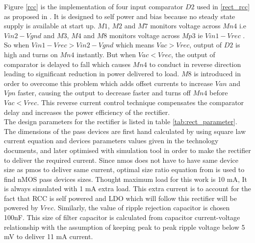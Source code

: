 \documentclass[12pt,a4paper,UKenglish]{report}
\begin{document}
Figure \ref{rcc}  is the implementation of four input comparator $D2$ used in \ref{rect_rcc} as proposed in \cite{rectrcc}. It is designed to self power and bias because no steady state supply is available at start up. $M1$, $M2$ and $M7$ monitors voltage across $Mn4$ i.e $Vin2 - Vgnd$ and $M3$, $M4$ and $M8$ monitors voltage across $Mp3$ ie $Vin1 - Vrec$ . So when $Vin1 - Vrec > Vin2 - Vgnd$ which means $Vac > Vrec$, output of $D2$ is high and turns on $Mn4$ instantly. But when $Vac < Vrec$, the output of comparator is delayed to fall which causes $Mn4$ to conduct in reverse direction leading to significant reduction in power delivered to load. $M8$ is introduced in order to overcome this problem which adds offset currents to increase $Van$ and $Vpn$ faster, causing the output to decrease faster and turns off $Mn4$ before $Vac < Vrec$. This reverse current control technique compensates the comparator delay and increases the power efficiency of the rectifier. \\

The design parameters for the rectifier is listed in table  \ref{tab:rect_parameter}. The dimensions of the pass devices are first hand calculated by using square law current equation and devices parameters values given in the technology documents, and later optimised with simulation tool in order to make the rectifier to deliver the required current. Since \acrshort{nmos} does not have to have same device size as \acrshort{pmos} to deliver same current, optimal size ratio equation from \cite{rectsize} is used to find nMOS pass devices sizes. Thought maximum load for this work is 10 mA, It is always simulated with 1 mA extra load. This extra current is to account for the fact that RCC is self powered and LDO which will follow this rectifier will be powered by $Vrec$. Similarly, the value of ripple rejection capacitor is chosen 100nF. This size of 
filter capacitor is calculated from capacitor current-voltage relationship with the assumption of keeping peak to peak ripple voltage below 5 mV to deliver 11 mA current.  \\
\end{document}
